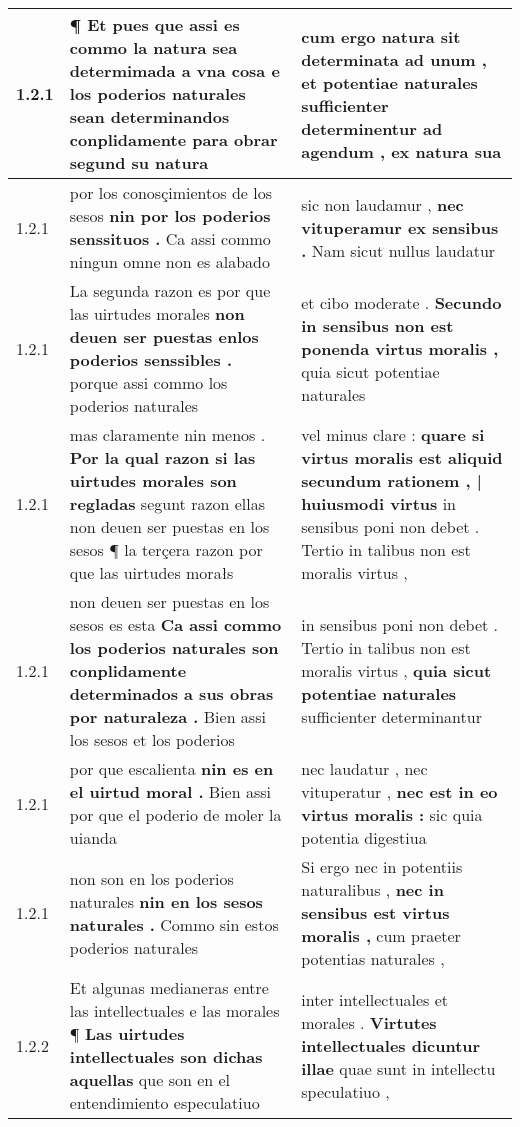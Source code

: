 \begin{tabular}{|p{1cm}|p{6.5cm}|p{6.5cm}|}
1.2.1 & ¶ Et pues que assi es commo la natura sea determimada a vna cosa \textbf{ e los poderios naturales sean determinandos conplidamente para obrar } segund su natura & cum ergo natura sit determinata ad unum , \textbf{ et potentiae naturales sufficienter determinentur ad agendum , } ex natura sua \\\hline
1.2.1 & por los conosçimientos de los sesos \textbf{ nin por los poderios senssituos . } Ca assi commo ningun omne non es alabado & sic non laudamur , \textbf{ nec vituperamur ex sensibus . } Nam sicut nullus laudatur \\\hline
1.2.1 & La segunda razon es por que las uirtudes morales \textbf{ non deuen ser puestas enlos poderios senssibles . } porque assi commo los poderios naturales & et cibo moderate . \textbf{ Secundo in sensibus non est ponenda virtus moralis , } quia sicut potentiae naturales \\\hline
1.2.1 & mas claramente nin menos . \textbf{ Por la qual razon si las uirtudes morales son regladas } segunt razon ellas non deuen ser puestas en los sesos ¶ la terçera razon por que las uirtudes morałs & vel minus clare : \textbf{ quare si virtus moralis est aliquid secundum rationem , | huiusmodi virtus } in sensibus poni non debet . Tertio in talibus non est moralis virtus , \\\hline
1.2.1 & non deuen ser puestas en los sesos es esta \textbf{ Ca assi commo los poderios naturales son conplidamente determinados a sus obras por naturaleza . } Bien assi los sesos et los poderios & in sensibus poni non debet . Tertio in talibus non est moralis virtus , \textbf{ quia sicut potentiae naturales } sufficienter determinantur \\\hline
1.2.1 & por que escalienta \textbf{ nin es en el uirtud moral . } Bien assi por que el poderio de moler la uianda & nec laudatur , nec vituperatur , \textbf{ nec est in eo virtus moralis : } sic quia potentia digestiua \\\hline
1.2.1 & non son en los poderios naturales \textbf{ nin en los sesos naturales . } Commo sin estos poderios naturales & Si ergo nec in potentiis naturalibus , \textbf{ nec in sensibus est virtus moralis , } cum praeter potentias naturales , \\\hline
1.2.2 & Et algunas medianeras entre las intellectuales e las morales ¶ \textbf{ Las uirtudes intellectuales son dichas aquellas } que son en el entendimiento especulatiuo & inter intellectuales et morales . \textbf{ Virtutes intellectuales dicuntur illae } quae sunt in intellectu speculatiuo , \\\hline

\end{tabular}
